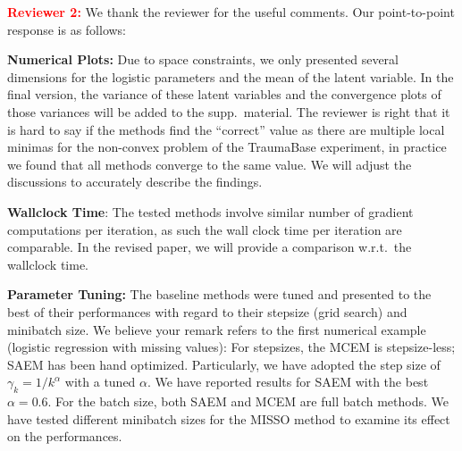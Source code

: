 \documentclass{article}
\begin{document}
\textbf{\textcolor{red}{Reviewer 2:}} We thank the reviewer for the useful comments. Our point-to-point response is as follows:\vspace{-5pt}

\textbf{Numerical Plots:} Due to space constraints, we only presented several dimensions for the logistic parameters and the mean of the latent variable. 
In the final version, the variance of these latent variables and the convergence plots of those variances will be added to the supp.~material.
The reviewer is right that it is hard to say if the methods find the ``correct'' value as there are multiple local minimas for the non-convex problem of the TraumaBase experiment, in practice we found that all methods converge to the same value. We will adjust the discussions to accurately describe the findings. \vspace{-5pt}



\textbf{Wallclock Time}:
The tested methods involve similar number of gradient computations per iteration, as such the wall clock time per iteration are comparable. In the revised paper, we will provide a comparison w.r.t.~the wallclock time.\vspace{-5pt}


\textbf{Parameter Tuning:}
The baseline methods were tuned and presented to the best of their performances with regard to their stepsize (grid search) and minibatch size.
We believe your remark refers to the first numerical example (logistic regression with missing values): For stepsizes, the MCEM is stepsize-less; SAEM has been hand optimized. Particularly, we have adopted the step size of $\gamma_k = 1/k^{\alpha}$ with a tuned $\alpha$. We have reported results for SAEM with the best $\alpha = 0.6$. For the batch size, both SAEM and MCEM are full batch methods. We have tested different minibatch sizes for the MISSO method to examine its effect on the performances.
\end{document}
